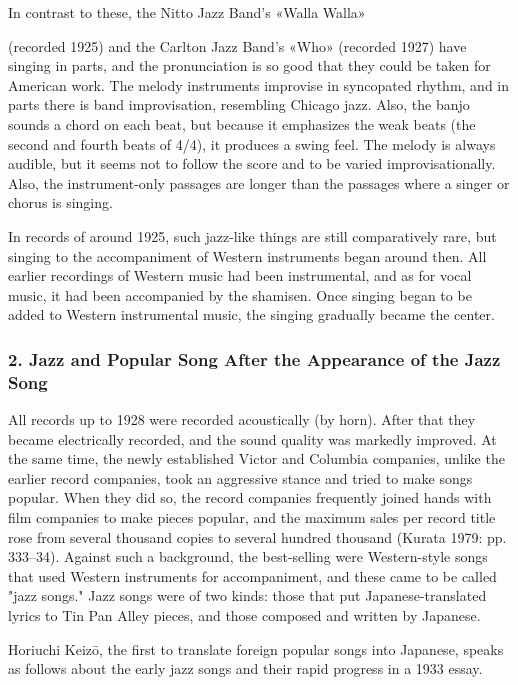 In contrast to these, the Nitto Jazz Band's «Walla Walla»

\begin{gquote}
(recorded 1925) and the Carlton Jazz Band's «Who» (recorded 1927) have singing in parts, and the pronunciation is so good that they could be taken for American work. The melody instruments improvise in syncopated rhythm, and in parts there is band improvisation, resembling Chicago jazz. Also, the banjo sounds a chord on each beat, but because it emphasizes the weak beats (the second and fourth beats of 4/4), it produces a swing feel. The melody is always audible, but it seems not to follow the score and to be varied improvisationally. Also, the instrument-only passages are longer than the passages where a singer or chorus is singing.
\end{gquote}

In records of around 1925, such jazz-like things are still comparatively rare, but singing to the accompaniment of Western instruments began around then. All earlier recordings of Western music had been instrumental, and as for vocal music, it had been accompanied by the shamisen. Once singing began to be added to Western instrumental music, the singing gradually became the center.

\subsubsection{2. Jazz and Popular Song After the Appearance of the Jazz Song}

All records up to 1928 were recorded acoustically (by horn). After that they became electrically recorded, and the sound quality was markedly improved. At the same time, the newly established Victor and Columbia companies, unlike the earlier record companies, took an aggressive stance and tried to make songs popular. When they did so, the record companies frequently joined hands with film companies to make pieces popular, and the maximum sales per record title rose from several thousand copies to several hundred thousand (Kurata 1979: pp. 333–34). Against such a background, the best-selling were Western-style songs that used Western instruments for accompaniment, and these came to be called "jazz songs." Jazz songs were of two kinds: those that put Japanese-translated lyrics to Tin Pan Alley pieces, and those composed and written by Japanese.

Horiuchi Keizō, the first to translate foreign popular songs into Japanese, speaks as follows about the early jazz songs and their rapid progress in a 1933 essay.

